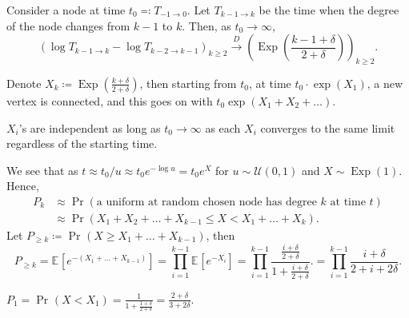 \begin{lemma}
	Consider a node at time \(t_0 \eqqcolon T_{-1 \to 0}\). Let \(T_{k-1 \to k}\)  be the time when the degree of the node changes from \(k-1\) to \(k\). Then, as \(t_0 \to \infty \),
	\[
		(\log T_{k-1 \to k} - \log T_{k-2 \to k-1})_{k \geq 2}
		\overset{D}{\to} \left( \operatorname{Exp} \left( \frac{k-1 + \delta }{2 + \delta } \right) \right) _{k \geq 2}.
	\]
\end{lemma}

Denote \(X_{k} \coloneqq \operatorname{Exp} (\frac{k+\delta }{2 + \delta })\), then starting from \(t_0\), at time \(t_0 \cdot \exp (X_1)\), a new vertex is connected, and this goes on with \(t_0 \exp (X_1 + X_2 + \dots )\).

\begin{remark}
	\(X_i\)'s are independent as long as \(t_0 \to \infty \) as each \(X_i\) converges to the same limit regardless of the starting time.
\end{remark}

We see that as \(t \approx t_0 / u \approx t_0 e^{- \log u} = t_0 e^{X}\) for \(u \sim \mathcal{U} (0, 1)\) and \(X \sim \operatorname{Exp}(1) \). Hence,
\[
	\begin{split}
		P_k
		 & \approx \Pr_{}\left(\text{a uniform at random chosen node has degree \(k\) at time \(t\)} \right) \\
		 & \approx \Pr_{}\left(X_1 + X_2 + \dots + X_{k-1} \leq X < X_1 + \dots + X_k\right).
	\end{split}
\]
Let \(P_{\geq k} \coloneqq \Pr_{}\left(X \geq X_1 + \dots + X_{k-1}\right) \), then
\[
	P_{\geq k}
	= \mathbb{E}_{}[e^{-(X_1 + \dots + X_{k-1})}]
	= \prod_{i=1}^{k-1} \mathbb{E}_{}[e^{-X_i}]
	= \prod_{i=1}^{k-1} \frac{\frac{i+\delta }{2 + \delta }}{1 + \frac{i + \delta }{2 + \delta }}.
	= \prod_{i=1}^{k-1} \frac{i + \delta }{2 + i + 2\delta }.
\]

\begin{eg}
	\(P_1 = \Pr_{}\left(X < X_1\right) = \frac{1}{1 + \frac{1 + \delta }{2 + \delta }} = \frac{2 + \delta }{3 + 2\delta }\).
\end{eg}

